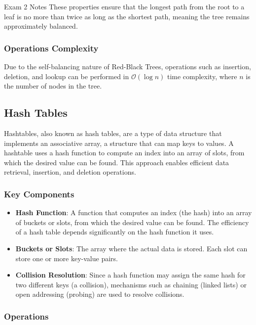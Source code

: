\begin{examnotes}{Exam 2 Notes}
    These properties ensure that the longest path from the root to a leaf is no more than twice as long as the shortest path, meaning the tree remains approximately balanced.
    
    \subsubsection*{Operations Complexity}
    
    Due to the self-balancing nature of Red-Black Trees, operations such as insertion, deletion, and lookup can be performed in $\mathcal{O}(\log n)$ time complexity, where $n$ is the number of nodes 
    in the tree.

    \subsection*{Hash Tables}

    Hashtables, also known as hash tables, are a type of data structure that implements an associative array, a structure that can map keys to values. A hashtable uses a hash function to compute an 
    index into an array of slots, from which the desired value can be found. This approach enables efficient data retrieval, insertion, and deletion operations.
    
    \subsubsection*{Key Components}
    
    \begin{itemize}
        \item \textbf{Hash Function}: A function that computes an index (the hash) into an array of buckets or slots, from which the desired value can be found. The efficiency of a hash table depends 
        significantly on the hash function it uses.
        \item \textbf{Buckets or Slots}: The array where the actual data is stored. Each slot can store one or more key-value pairs.
        \item \textbf{Collision Resolution}: Since a hash function may assign the same hash for two different keys (a collision), mechanisms such as chaining (linked lists) or open addressing (probing) 
        are used to resolve collisions.
    \end{itemize}
    
    \subsubsection*{Operations}
    

\end{examnotes}

